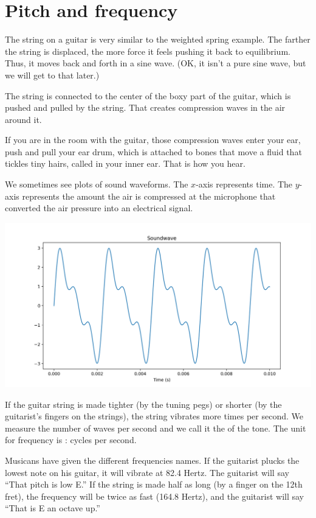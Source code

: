 \section{Pitch and frequency}

The string on a guitar is very similar to the weighted spring
example. The farther the string is displaced, the more force it feels
pushing it back to equilibrium. Thus, it moves back and forth in a
sine wave. (OK, it isn't a pure sine wave, but we will get to that later.)

The string is connected to the center of the boxy part of the guitar,
which is pushed and pulled by the string. That creates compression
waves in the air around it.

If you are in the room with the guitar, those compression waves enter
your ear, push and pull your ear drum, which is attached to bones that
move a fluid that tickles tiny hairs, called  in your
inner ear. That is how you hear.

We sometimes see plots of sound waveforms.  The $x$-axis represents
time. The $y$-axis represents the amount the air is compressed at the
microphone that converted the air pressure into an electrical signal.

\includegraphics[width=0.8\linewidth]{soundwave.png}

If the guitar string is made tighter (by the tuning pegs) or shorter
(by the guitarist's fingers on the strings), the string vibrates more
times per second.  We measure the number of waves per second and we
call it the  of the tone. The unit for frequency is
: cycles per second.

Musicans have given the different frequencies names. If the guitarist
plucks the lowest note on his guitar, it will vibrate at 82.4
Hertz. The guitarist will say ``That pitch is low E.'' If the string is made
half as long (by a finger on the 12th fret), the frequency will be
twice as fast (164.8 Hertz), and the guitarist will say ``That is E an
octave up.''

